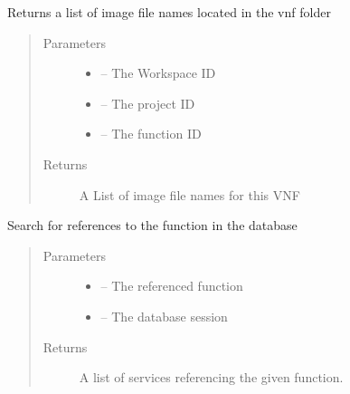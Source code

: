 \documentclass[letterpaper,10pt,english]{sphinxmanual}
\begin{document}

\begin{fulllineitems}
\label{_source/son_editor.impl:son_editor.impl.functionsimpl.get_image_files}
Returns a list of image file names located in the vnf folder
\begin{quote}\begin{description}
\item[{Parameters}] \leavevmode\begin{itemize}
\item {} 
 -- The Workspace ID

\item {} 
 -- The project ID

\item {} 
 -- The function ID

\end{itemize}

\item[{Returns}] \leavevmode
A List of image file names for this VNF

\end{description}\end{quote}

\end{fulllineitems}


\begin{fulllineitems}
\label{_source/son_editor.impl:son_editor.impl.functionsimpl.get_references}
Search for references to the function in the database
\begin{quote}\begin{description}
\item[{Parameters}] \leavevmode\begin{itemize}
\item {} 
 -- The referenced function

\item {} 
 -- The database session

\end{itemize}

\item[{Returns}] \leavevmode
A list of services referencing the given function.

\end{description}\end{quote}

\end{fulllineitems}
\end{document}
